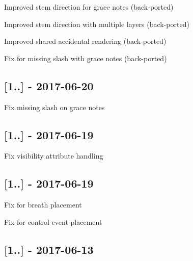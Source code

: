 \begin{DoxyItemize}
\item Improved stem direction for grace notes (back-\/ported)
\item Improved stem direction with multiple layers (back-\/ported)
\item Improved shared accidental rendering (back-\/ported)
\item Fix for missing slash with grace notes (back-\/ported)
\end{DoxyItemize}

\subsection*{\mbox{[}1..\mbox{]} -\/ 2017-\/06-\/20}


\begin{DoxyItemize}
\item Fix missing slash on grace notes
\end{DoxyItemize}

\subsection*{\mbox{[}1..\mbox{]} -\/ 2017-\/06-\/19}


\begin{DoxyItemize}
\item Fix visibility attribute handling
\end{DoxyItemize}

\subsection*{\mbox{[}1..\mbox{]} -\/ 2017-\/06-\/19}


\begin{DoxyItemize}
\item Fix for breath placement
\item Fix for control event placement
\end{DoxyItemize}

\subsection*{\mbox{[}1..\mbox{]} -\/ 2017-\/06-\/13}


